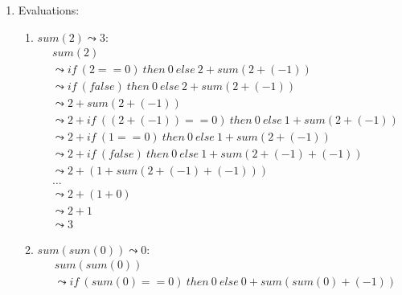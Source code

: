 \begin{exercise}{}
\begin{solution}
\begin{enumerate}
\begin{itemize}
\begin{gather*}
            \AxiomC{}
            \UnaryInfC{\(if ~(false) ~t_2 ~else ~t_3 \leadsto t_3\)}
            \DisplayProof
          \end{gather*}
        \item Function call:
          \begin{gather*}
            \alwaysNoLine
            \AxiomC{\(b_0\) is the body of \(f\)}
            \UnaryInfC{\((x_1, \ldots, x_n)\) are parameters of \(f\)}
            \UnaryInfC{\(b_0[x_1 := t_1] \to b_1 \quad \ldots \quad b_{n-1}[x_n := t_n] \to b_n\)}
            \alwaysSingleLine
            \UnaryInfC{\(f(t_1, \ldots, t_n) \leadsto b_n\)}
            \DisplayProof
          \end{gather*}
      \end{itemize}

      \item Evaluations:
      \begin{enumerate}
        \item \(sum(2) \leadsto 3\):
          \begin{align*}
            &sum(2)\\
            &\leadsto if ~(2 == 0) ~ then ~ 0 ~ else ~ 2 + sum(2 + (-1))\\
            &\leadsto if ~(false) ~ then ~ 0 ~ else ~ 2 + sum(2 + (-1))\\
            &\leadsto 2 + sum(2 + (-1))\\
            &\leadsto 2 + if ~((2 + (-1)) == 0) ~ then ~ 0 ~ else ~ 1 + sum(2 + (-1))\\
            &\leadsto 2 + if ~(1 == 0) ~ then ~ 0 ~ else ~ 1 + sum(2 + (-1))\\
            &\leadsto 2 + if ~(false) ~ then ~ 0 ~ else ~ 1 + sum(2 + (-1) + (-1))\\
            &\leadsto 2 + (1 + sum(2 + (-1) + (-1)))\\
            & \ldots \\
            &\leadsto 2 + (1 + 0) \\
            &\leadsto 2 + 1 \\
            &\leadsto 3
          \end{align*}
        \item \(sum(sum(0)) \leadsto 0\):
        \begin{align*}
          &sum(sum(0))\\
          &\leadsto if ~(sum(0) == 0) ~ then ~ 0 ~ else ~ 0 + sum(sum(0) + (-1))\\

\end{align*}
\end{enumerate}
\end{enumerate}
\end{solution}
\end{exercise}

